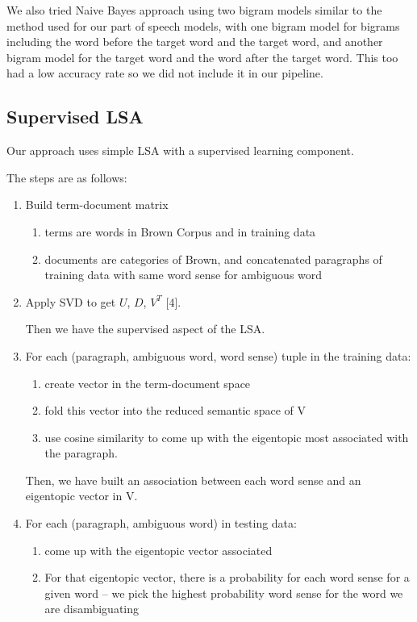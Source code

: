 \documentclass[10pt, letterpaper]{article}
\begin{document}
        We also tried Naive Bayes approach using two bigram models similar to the method used for our part of speech models, with one bigram model for bigrams including the word before the target word and the target word, and another bigram model for the target word and the word after the target word. This too had a low accuracy rate so we did not include it in our pipeline.
	\subsection{Supervised LSA}
	Our approach uses simple LSA with a supervised learning component. 

	The steps are as follows: 

	\begin{enumerate}

	\item Build term-document matrix 
		\begin{enumerate}
		\item terms are words in Brown Corpus and in training data
		\item documents are categories of Brown, and concatenated paragraphs of training data with same word sense for ambiguous word
		\end{enumerate}
	\item Apply SVD to get $U$, $D$, $V^T$ [4].

	Then we have the supervised aspect of the LSA.  
	\item For each (paragraph, ambiguous word, word sense) tuple in the training data:
		\begin{enumerate}
		\item create vector in the term-document space
		\item fold this vector into the reduced semantic space of V
		\item use cosine similarity to come up with the eigentopic most associated with the paragraph.
		\end{enumerate} 
	Then, we have built an association between each word sense and an eigentopic vector in V. 
	\item For each (paragraph, ambiguous word) in testing data:
		\begin{enumerate}
		\item come up with the eigentopic vector associated
		\item For that eigentopic vector, there is a probability for each word sense for a given word -- we pick the highest probability word sense for the word we are disambiguating
		\end{enumerate}

	\end{enumerate}
\end{document}
